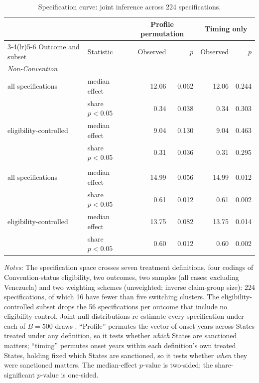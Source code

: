 \begin{table}[t]
\centering
\caption{Specification curve: joint inference across 224 specifications.}
\label{tab:specjoint}
\small
\setlength{\tabcolsep}{4pt}
\begin{tabular}{llrrrr}
\toprule
 & & \multicolumn{2}{c}{Profile permutation} & \multicolumn{2}{c}{Timing only} \\
\cmidrule(lr){3-4}\cmidrule(lr){5-6}
Outcome and subset & Statistic & Observed & $p$ & Observed & $p$ \\
\midrule
\multicolumn{6}{l}{\emph{Non-Convention}} \\
\quad all specifications      & median effect      & 12.06 & 0.062 & 12.06 & 0.244 \\
                              & share $p<0.05$     &  0.34 & 0.038 &  0.34 & 0.303 \\
\quad eligibility-controlled & median effect      &  9.04 & 0.130 &  9.04 & 0.463 \\
                              & share $p<0.05$     &  0.31 & 0.036 &  0.31 & 0.295 \\
\addlinespace
\multicolumn{6}{l}{\emph{UNCITRAL}} \\
\quad all specifications      & median effect      & 14.99 & 0.056 & 14.99 & 0.012 \\
                              & share $p<0.05$     &  0.61 & 0.012 &  0.61 & 0.002 \\
\quad eligibility-controlled & median effect      & 13.75 & 0.082 & 13.75 & 0.014 \\
                              & share $p<0.05$     &  0.60 & 0.012 &  0.60 & 0.002 \\
\bottomrule
\end{tabular}
\par\medskip
\begin{minipage}{0.95\linewidth}\footnotesize
\emph{Notes:} The specification space crosses seven treatment definitions, four
codings of Convention-status eligibility, two outcomes, two samples (all cases; excluding
Venezuela) and two weighting schemes (unweighted; inverse claim-group size): 224
specifications, of which 16 have fewer than five switching clusters. The
eligibility-controlled subset drops the 56 specifications per outcome that
include no eligibility control. Joint null distributions re-estimate every
specification under each of $B=500$ draws \citep{simonsohn2020,young2019}.
``Profile'' permutes the vector of onset years across States treated under any
definition, so it tests whether \emph{which} States are sanctioned matters;
``timing'' permutes onset years within each definition's own treated States,
holding fixed which States are sanctioned, so it tests whether \emph{when} they
were sanctioned matters. The median-effect $p$-value is two-sided; the
share-significant $p$-value is one-sided.
\end{minipage}
\end{table}
